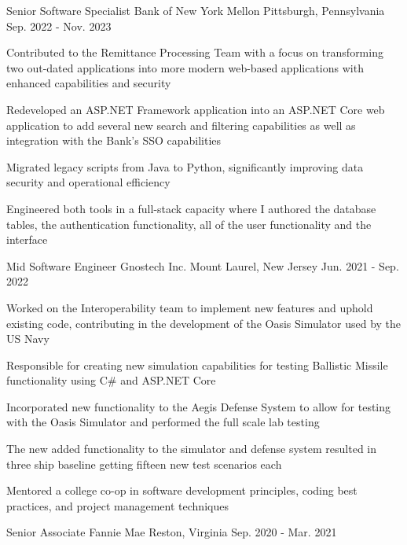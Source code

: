 \begin{cventries}
  \cventry
    {Senior Software Specialist}
    {Bank of New York Mellon}
    {Pittsburgh, Pennsylvania}
    {Sep. 2022 - Nov. 2023}
    {
      \begin{cvitems}
        \item {Contributed to the Remittance Processing Team with a focus on transforming two out-dated applications into more modern web-based applications with enhanced capabilities and security}
        \item {Redeveloped an ASP.NET Framework application into an ASP.NET Core web application to add several new search and filtering capabilities as well as integration with the Bank's SSO capabilities}
        \item {Migrated legacy scripts from Java to Python, significantly improving data security and operational efficiency}
        \item {Engineered both tools in a full-stack capacity where I authored the database tables, the authentication functionality, all of the user functionality and the interface}
      \end{cvitems}
    }
  \cventry
    {Mid Software Engineer}
    {Gnostech Inc.}
    {Mount Laurel, New Jersey}
    {Jun. 2021 - Sep. 2022}
    {
      \begin{cvitems}
        \item {Worked on the Interoperability team to implement new features and uphold existing code, contributing in the development of the Oasis Simulator used by the US Navy}
        \item {Responsible for creating new simulation capabilities for testing Ballistic Missile functionality using C\# and ASP.NET Core}
        \item {Incorporated new functionality to the Aegis Defense System to allow for testing with the Oasis Simulator and performed the full scale lab testing}
        \item {The new added functionality to the simulator and defense system resulted in three ship baseline getting fifteen new test scenarios each}
        \item {Mentored a college co-op in software development principles, coding best practices, and project management techniques}
      \end{cvitems}
    }
  \cventry
    {Senior Associate}
    {Fannie Mae}
    {Reston, Virginia}
    {Sep. 2020 - Mar. 2021}
    {
      \begin{cvitems}

\end{cvitems}}
\end{cventries}
